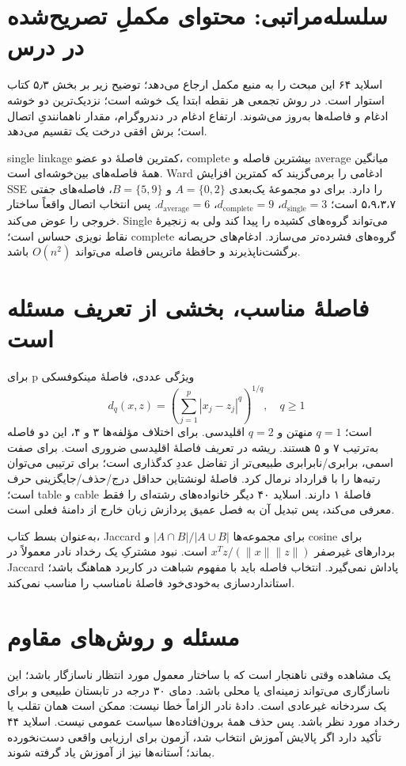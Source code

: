 \section{سلسله‌مراتبی: محتوای مکملِ تصریح‌شده در درس}

اسلاید ۶۴ این مبحث را به منبع مکمل ارجاع می‌دهد؛ توضیح زیر بر بخش ۵٫۳ کتاب استوار است. در روش تجمعی هر نقطه ابتدا یک خوشه است؛ نزدیک‌ترین دو خوشه ادغام و فاصله‌ها به‌روز می‌شوند. ارتفاع ادغام در دندروگرام، مقدار ناهمانندیِ اتصال است؛ برش افقی درخت یک تقسیم می‌دهد.

single linkage کمترین فاصلهٔ دو عضو، complete بیشترین فاصله و average میانگین همهٔ فاصله‌های بین‌خوشه‌ای است. Ward ادغامی را برمی‌گزیند که کمترین افزایش SSE را دارد. برای دو مجموعهٔ یک‌بعدی $A=\{0,2\}$ و $B=\{5,9\}$، فاصله‌های جفتی ۵،۹،۳،۷ است؛ $d_{\mathrm{single}}=3$، $d_{\mathrm{complete}}=9$، $d_{\mathrm{average}}=6$. پس انتخاب اتصال واقعاً ساختار خروجی را عوض می‌کند. Single می‌تواند گروه‌های کشیده را پیدا کند ولی به زنجیرهٔ نقاط نویزی حساس است؛ complete گروه‌های فشرده‌تر می‌سازد. ادغام‌های حریصانه برگشت‌ناپذیرند و حافظهٔ ماتریس فاصله می‌تواند \(O(n^2)\) باشد.

\section{فاصلهٔ مناسب، بخشی از تعریف مسئله است}

برای p ویژگی عددی، فاصلهٔ مینکوفسکی \[
d_q(x,z)=\left(\sum_{j=1}^p|x_j-z_j|^q\right)^{1/q},\quad q\ge1
\] است؛ $q=1$ منهتن و $q=2$ اقلیدسی. برای اختلاف مؤلفه‌ها ۳ و ۴، این دو فاصله به‌ترتیب ۷ و ۵ هستند. ریشه در تعریف فاصلهٔ اقلیدسی ضروری است. برای صفت اسمی، برابری/نابرابری طبیعی‌تر از تفاضل عددِ کدگذاری است؛ برای ترتیبی می‌توان رتبه‌ها را با قرارداد نرمال کرد. فاصلهٔ لونشتاین حداقل درج/حذف/جایگزینی حرف است؛ table و cable فاصلهٔ ۱ دارند. اسلاید ۴۰ دیگر خانواده‌های رشته‌ای را فقط معرفی می‌کند، پس تبدیل آن به فصل عمیق پردازش زبان خارج از دامنهٔ فعلی است.

به‌عنوان بسط کتاب، Jaccard برای مجموعه‌ها \(|A\cap B|/|A\cup B|\) و cosine برای بردارهای غیرصفر \(x^Tz/(\|x\|\|z\|)\) است. نبود مشترکِ یک رخداد نادر معمولاً در Jaccard پاداش نمی‌گیرد. انتخاب فاصله باید با مفهوم شباهت در کاربرد هماهنگ باشد؛ استانداردسازی به‌خودی‌خود فاصلهٔ نامناسب را مناسب نمی‌کند.

\section{مسئله و روش‌های مقاوم}

یک مشاهده وقتی ناهنجار است که با ساختار معمول مورد انتظار ناسازگار باشد؛ این ناسازگاری می‌تواند زمینه‌ای یا محلی باشد. دمای ۳۰ درجه در تابستان طبیعی و برای یک سردخانه غیرعادی است. دادهٔ نادر الزاماً خطا نیست: ممکن است همان تقلب یا رخداد مورد نظر باشد. پس حذف همهٔ برون‌افتاده‌ها سیاست عمومی نیست. اسلاید ۴۴ تأکید دارد اگر پالایش آموزش انتخاب شد، آزمون برای ارزیابی واقعی دست‌نخورده بماند؛ آستانه‌ها نیز از آموزش یاد گرفته شوند.

